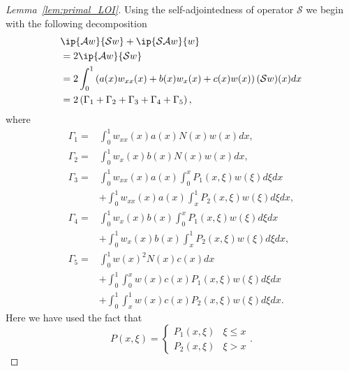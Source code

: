 \documentclass[US letter, 9 pt, conference]{ieeeconf}  \usepackage{setspace}
\newcommand{\igzo}{\int_0^1}
\newcommand{\igzx}{\int_0^x}
\newcommand{\igxo}{\int_x^1}
\newcommand{\sop}{\mathcal{S}}
\begin{document}
\begin{proof}[Lemma~\ref{lem:primal_LOI}]
Using the self-adjointedness of operator $\sop$ we begin with the following decomposition
\begin{align}
&\ip{\mathcal{A}w}{\mathcal{S}w}+\ip{\mathcal{S}\mathcal{A}w}{w} \nonumber \\
&=2\ip{\mathcal{A}w}{\mathcal{S}w} \nonumber \\
 &=2\igzo \left(a(x)w_{xx}(x)+b(x)w_x(x)+c(x)w(x) \right)(\sop w)(x)dx \nonumber \\
&\label{Gamma_eqn} = 2\left(\Gamma_1+\Gamma_2+\Gamma_3+\Gamma_4+\Gamma_5\right),
\end{align}
 where
 \begin{align*}
 \Gamma_1 =& \igzo w_{xx}(x)a(x)N(x)w(x)dx, \\
 \Gamma_2 =& \igzo w_x(x)b(x)N(x)w(x)dx, \\
 \Gamma_3 =& \igzo w_{xx}(x)a(x) \igzx P_1(x,\xi)w(\xi) d\xi dx \\
 &+ \igzo w_{xx}(x)a(x)\igxo P_2(x,\xi)w(\xi)d \xi  dx,\\
 \Gamma_4 = &\igzo w_x(x)b(x) \igzx P_1(x,\xi)w(\xi) d\xi dx \\
 &+ \igzo w_x(x)b(x)\igxo P_2(x,\xi)w(\xi)d\xi dx,\\
 \Gamma_5 = & \igzo w(x)^2 N(x) c(x) dx \\
 &+ \igzo \igzx w(x) c(x) P_1(x,\xi)w(\xi) d\xi dx \\
 & + \igzo \igxo w(x) c(x) P_2(x,\xi)w(\xi) d\xi dx.
\end{align*} Here we have used the fact that
\[
P(x,\xi) = \begin{cases} P_1(x,\xi) & \xi \leq x \\
P_2(x,\xi) &  \xi>x \end{cases}.
\]



\end{proof}
\end{document}
